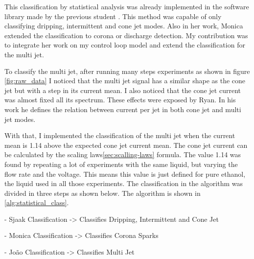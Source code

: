  

This classification by statistical analysis was already implemented in the software library made by the previous student \cite{Monica}.
This method was capable of only classifying dripping, intermittent and cone jet modes. Also in her work, Monica extended the classification to corona or discharge detection.
My contribution was to integrate her work on my control loop model and extend the classification for the multi jet.

To classify the multi jet, after running many steps experiments as shown in figure \ref{fig:raw_data} I noticed that the multi jet signal has a similar shape as the cone jet but with a step in its current mean. 
I also noticed that the cone jet current was almost fixed all its spectrum. 
These effects were exposed by Ryan\cite{Ryan}. In his work he defines the relation between current per jet in both cone jet and multi jet modes.

With that, I implemented the classification of the multi jet when the current mean is 1.14 above the expected cone jet current mean. 
The cone jet current can be calculated by the scaling laws\ref{sec:scalling-laws} formula.
The value 1.14 was found by repeating a lot of experiments with the same liquid, but varying the flow rate and the voltage. This means this value is just defined for pure ethanol, the liquid used in all those experiments.
The classification in the algorithm was divided in three steps as shown below. The algorithm is shown in \ref{alg:statistical_class}.

        - Sjaak Classification -> Classifies Dripping, Intermittent and Cone Jet
        
        - Monica Classification -> Classifies Corona Sparks

        - João Classification -> Classifies Multi Jet

